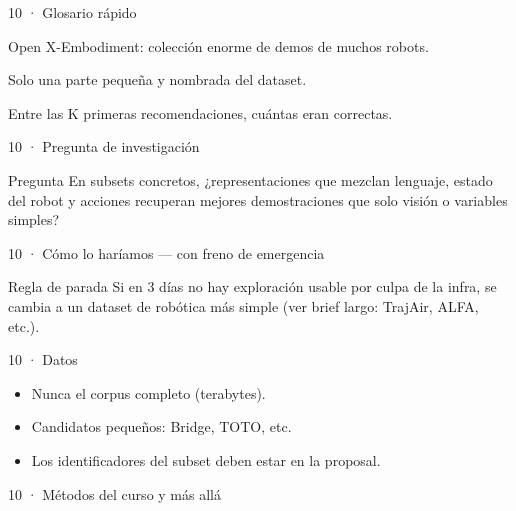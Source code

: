 \begin{frame}{10 · Glosario rápido}
  \begin{description}[font=\bfseries\scriptsize,style=nextline,leftmargin=1.6cm]
    \item[OXE] Open X-Embodiment: colección enorme de demos de muchos robots.
    \item[Subset] Solo una parte pequeña y nombrada del dataset.
    \item[Recall@K] Entre las K primeras recomendaciones, cuántas eran correctas.
  \end{description}
\end{frame}

\begin{frame}{10 · Pregunta de investigación}
  \begin{block}{Pregunta}
    En subsets concretos, ¿representaciones que mezclan lenguaje, estado del robot y acciones recuperan mejores demostraciones que solo visión o variables simples?
  \end{block}
\end{frame}

\begin{frame}{10 · Cómo lo haríamos --- con freno de emergencia}
  \vspace{0.35em}
  \begin{block}{Regla de parada}
    Si en 3 días no hay exploración usable por culpa de la infra, se cambia a un dataset de robótica más simple (ver brief largo: TrajAir, ALFA, etc.).
  \end{block}
\end{frame}

\begin{frame}{10 · Datos}
  \begin{itemize}
    \item Nunca el corpus completo (terabytes).
    \item Candidatos pequeños: Bridge, TOTO, etc.
    \item Los identificadores del subset deben estar en la proposal.
  \end{itemize}
\end{frame}

\begin{frame}{10 · Métodos del curso y más allá}
\end{frame}

